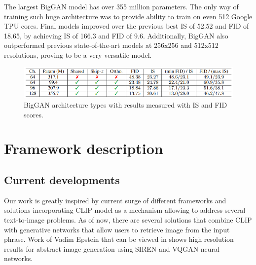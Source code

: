 \documentclass[11pt,a4paper,openany]{book}
\begin{document}
\noindent The largest BigGAN model has over 355 million parameters. The only way of training such huge architecture was to provide ability to train on even 512 Google TPU cores. Final models improved over the previous best IS of 52.52 and FID of 18.65, by achieving IS of 166.3 and FID of 9.6. Additionally, BigGAN also outperformed previous state-of-the-art models at 256x256 and 512x512 resolutions, proving to be a very versatile model.

\begin{figure}[ht!]
    \centering
    \includegraphics[scale=0.7]{figs/biggan_table.png}
    \caption{BigGAN architecture types with results measured with IS and FID scores.}\label{Fig:biggan_table}
\end{figure}



\chapter{Framework description}

\section{Current developments}

\noindent Our work is greatly inspired by current surge of different frameworks and solutions incorporating CLIP model as a mechanism allowing to address several text-to-image problems. As of now, there are several solutions that combine CLIP with generative networks that allow users to retrieve image from the input phrase. Work of Vadim Epstein that can be viewed in \cite{aphantasia} shows high resolution results for abstract image generation using SIREN \cite{siren} and VQGAN \cite{vqgan} neural networks.\
\end{document}
